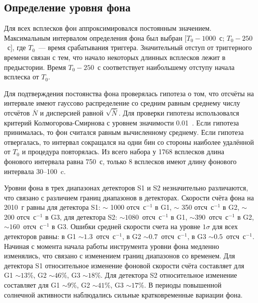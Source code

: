 \subsection{Определение уровня фона}
Для всех всплесков фон аппроксимировался постоянным значением. Максимальным 
интервалом определения фона был выбран [$T_0 - 1000$~с; $T_0 - 250$~с], 
где $T_0$~--- время срабатывания триггера. Значительный отступ от триггерного 
времени связан с тем, что начало некоторых длинных всплесков лежит в предыстории. 
Время $T_0-250$~с соответствует наибольшему отступу начала всплеска от $T_0$.

Для подтверждения постоянства фона проверялась гипотеза о том, что отсчёты на 
интервале имеют гауссово распределение со средним равным среднему числу отсчётов 
$\overline{N}$ и дисперсией равной $\sqrt{\overline{N}}$. Для проверки гипотезы 
использовался критерий Колмогорова-Смирнова с уровнем значимости 0.01~\citep{Press_1992NumRec}. 
Если гипотеза принималась, то фон считался равным вычисленному среднему. 
Если гипотеза отвергалась, то интервал сокращался на одни бин со стороны наиболее 
удалённой от $T_0$ и процедура повторялась. Из всего набора у 1768 всплесков длина 
фонового интервала равна 750~с, только 8 всплесков имеют длину фонового интервала 30--100~c.

Уровни фона в трех диапазонах детекторов S1 и S2 незначительно различаются, что 
связано с различием границ диапазонов в детекторах. Скорости счёта фона на 2010~г 
равны для детектора S1: $\sim$ 1000 отсч~с$^{-1}$ в G1, $\sim$ 350 отсч~с$^{-1}$ в G2, 
$\sim$ 200 отсч~с$^{-1}$ в G3, для детектора S2: $\sim 1080$~отсч~с$^{-1}$ в G1, 
$\sim 390$~отсч~с$^{-1}$ в G2, $\sim160$~отсч~с$^{-1}$ в G3. Ошибки средней 
скорости счета на уровне $1\sigma$ для всех детекторов равны: в G1 
$\sim 1.3$~отсч~с$^{-1}$, в G2 $\sim 0.7$~отсч~с$^{-1}$, в G3 $\sim 0.5$~отсч~с$^{-1}$. 
Начиная с момента начала работы инструмента уровни фона медленно изменялись, 
что связано с изменением границ диапазонов со временем. Для детектора S1 относительное 
изменение фоновой скорости счёта составляет для G1 $\sim 13$\%, G2 $\sim 46$\%, 
G3 $\sim 18$\%. Для детектора S2 относительное изменение составляет для G1 $\sim 9$\%, 
G2 $\sim 41$\%, G3 $\sim 17$\%. В периоды повышенной солнечной активности наблюдались 
сильные кратковременные вариации фона. 

